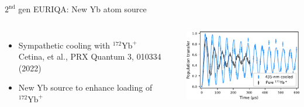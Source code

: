 \documentclass{beamer}
\begin{document}


\begin{frame}{$2^{\text{nd}}$ gen EURIQA: New Yb atom source}
  \begin{center}
    \begin{columns}
      \column{6cm}
      \begin{itemize}
      \item Sympathetic cooling with $^{172}\mathrm{Yb}^+$\\
        {\scriptsize Cetina, et al., PRX Quantum 3, 010334 (2022)}\\
        \vspace{1em}
      \item<2-> New Yb source to enhance loading of $^{172}\mathrm{Yb}^+$
      \end{itemize}
      \vspace{1em}
      \column{5.5cm}
      \includegraphics[width=5.5cm]{imgs/AxialCooling.pdf}
      \vspace{2cm}
    \end{columns}
  \end{center}
\end{frame}
\end{document}
